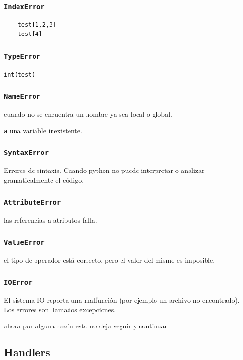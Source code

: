 \subsubsection{\texttt{IndexError}}

\begin{verbatim}
    test[1,2,3]
    test[4]
\end{verbatim}

\subsubsection{\texttt{TypeError}}

\texttt{int(test)}

\subsubsection{\texttt{NameError}} cuando no se encuentra un nombre ya sea local o global.

\texttt{a}
una variable inexistente.

\subsubsection{\texttt{SyntaxError}}

Errores de sintaxis. Cuando python no puede interpretar o analizar gramaticalmente el código.


\subsubsection{\texttt{AttributeError}} las referencias a atributos falla.


\subsubsection{\texttt{ValueError}} el tipo de operador está correcto, pero el valor del mismo es imposible.


\subsubsection{\texttt{IOError}} El sistema IO reporta una malfunción (por ejemplo un archivo no encontrado). Los errores son llamados excepciones.

ahora por alguna razón esto no deja seguir y continuar


\subsection{Handlers}

